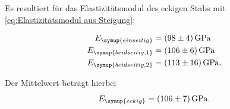 Es resultiert für das Elastizitätsmodul des eckigen Stabs mit \autoref{eq:Elastizitätsmodul aus Steigung}:

\begin{align}
  E_{\symup{einseitig}}&=\qty{98+-4}{\giga\pascal} \notag \\
  E_{\symup{beidseitig,1}}&=\qty{106+-6}{\giga\pascal}\notag \\
  E_{\symup{beidseitig,2}}&=\qty{113+-16}{\giga\pascal}. \notag
\end{align}

Der Mittelwert beträgt hierbei
\begin{equation}
  \bar{E}_{\symup{eckig}} = \qty{106+-7}{\giga\pascal}. \notag
\end{equation}

%
